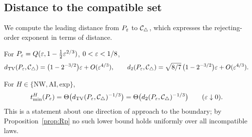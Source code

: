 \subsection{Distance to the compatible set}\label{sec:distance}

We compute the leading distance from $P_\varepsilon$ to $\mathcal C_{\triangle}$, which expresses the rejecting-order exponent in terms of distance.

\begin{theorem}\label{thm:distance}
For $P_\varepsilon=Q(\varepsilon,1-\tfrac12\varepsilon^{2/3})$, $0<\varepsilon<1/8$,
\[
d_{\operatorname{TV}}(P_\varepsilon,\mathcal C_{\triangle})=\bigl(1-2^{-3/2}\bigr)\varepsilon+O(\varepsilon^{4/3}),\qquad
d_2(P_\varepsilon,\mathcal C_{\triangle})=\sqrt{8/7}\,\bigl(1-2^{-3/2}\bigr)\varepsilon+O(\varepsilon^{4/3}).
\]
\end{theorem}

\begin{corollary}\label{cor:geometry}
For $H\in\{\mathrm{NW},\mathrm{AI},\mathrm{exp}\}$,
\[
t_{\min}^H(P_\varepsilon)=\Theta\bigl(d_{\operatorname{TV}}(P_\varepsilon,\mathcal C_{\triangle})^{-1/3}\bigr)=\Theta\bigl(d_2(P_\varepsilon,\mathcal C_{\triangle})^{-1/3}\bigr)\qquad(\varepsilon\downarrow0).
\]
This is a statement about one direction of approach to the boundary; by Proposition~\ref{prop:Rp} no such lower bound holds uniformly over all incompatible laws.
\end{corollary}

